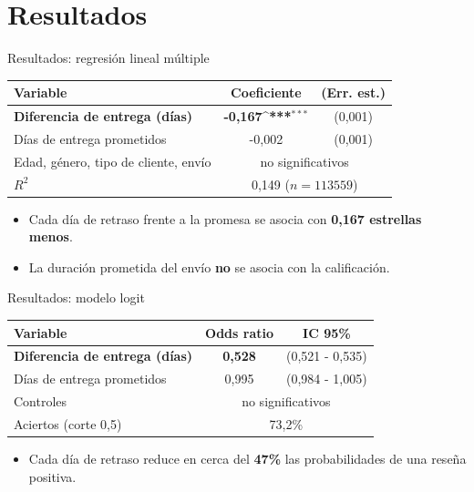 \documentclass[11pt, aspectratio=169, table]{beamer}
\def\sym#1{\ifmmode^{#1}\else\(^{#1}\)\fi}
\begin{document}
\section{Resultados}
\begin{frame}{Resultados: regresión lineal múltiple}
    \begin{center}
        \renewcommand{\arraystretch}{1.15}
        \small
        \begin{tabular}{lcc}
            \toprule
            \textbf{Variable} & \textbf{Coeficiente} & \textbf{(Err. est.)} \\
            \midrule
            \rowcolor{green!18}
            \textbf{Diferencia de entrega (días)} & \textbf{-0,167\sym{***}} & (0,001) \\
            Días de entrega prometidos & -0,002 & (0,001) \\
            Edad, género, tipo de cliente, envío & \multicolumn{2}{c}{no significativos} \\
            \midrule
            $R^2$ & \multicolumn{2}{c}{0,149 \quad ($n = 113559$)} \\
            \bottomrule
        \end{tabular}
    \end{center}
    \vspace{0.3em}
    \begin{itemize}
        \item Cada día de retraso frente a la promesa se asocia con \textbf{0,167 estrellas menos}.
        \item La duración prometida del envío \textbf{no} se asocia con la calificación.
    \end{itemize}
\end{frame}

\begin{frame}{Resultados: modelo logit}
    \begin{center}
        \renewcommand{\arraystretch}{1.15}
        \small
        \begin{tabular}{lcc}
            \toprule
            \textbf{Variable} & \textbf{Odds ratio} & \textbf{IC 95\%} \\
            \midrule
            \rowcolor{green!18}
            \textbf{Diferencia de entrega (días)} & \textbf{0,528} & (0,521 - 0,535) \\
            Días de entrega prometidos & 0,995 & (0,984 - 1,005) \\
            Controles & \multicolumn{2}{c}{no significativos} \\
            \midrule
            Aciertos (corte 0,5) & \multicolumn{2}{c}{73,2\%} \\
            \bottomrule
        \end{tabular}
    \end{center}
    \vspace{0.3em}
    \begin{itemize}
        \item Cada día de retraso reduce en cerca del \textbf{47\%} las probabilidades de una reseña positiva.
    \end{itemize}
\end{frame}
\end{document}
